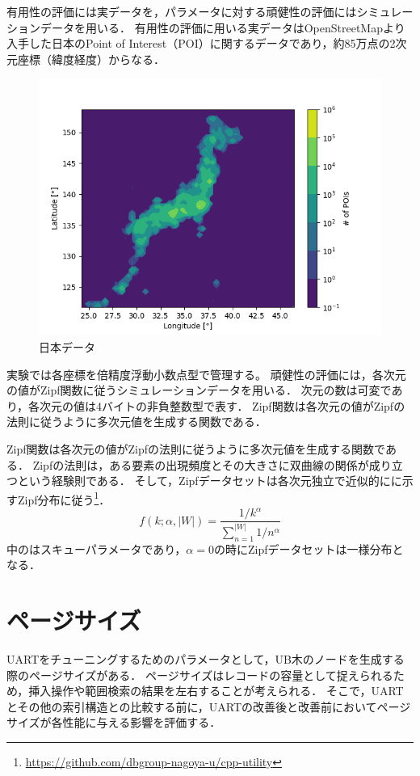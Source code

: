 有用性の評価には実データを，パラメータに対する頑健性の評価にはシミュレーションデータを用いる．
有用性の評価に用いる実データはOpenStreetMapより入手した日本のPoint of Interest（POI）に関するデータであり，約85万点の2次元座標（緯度経度）からなる．
\Fig{\ref{fig:japan}}
\begin{figure}[tb]
  \centering
  \includegraphics[scale=0.4]{./figures/japan-poi.png}
  \caption{日本データ}
  \label{fig:japan}
\end{figure}
実験では各座標を倍精度浮動小数点型で管理する。
頑健性の評価には，各次元の値がZipf関数に従うシミュレーションデータを用いる．
次元の数は可変であり，各次元の値は4バイトの非負整数型で表す．
Zipf関数は各次元の値がZipfの法則に従うように多次元値を生成する関数である．

Zipf関数は各次元の値がZipfの法則に従うように多次元値を生成する関数である．
Zipfの法則は，ある要素の出現頻度とその大きさに双曲線の関係が成り立つという経験則である．
そして，Zipfデータセットは各次元独立で近似的に\Eq{\ref{eq:zipf}}に示すZipf分布に従う\footnote{\footnotesize\url{https://github.com/dbgroup-nagoya-u/cpp-utility}}．
\begin{equation}
  \label{eq:zipf}
  f(k; \alpha, |W|) = \frac{1 / k^{\alpha}}{\sum_{n = 1}^{|W|} 1 / n^{\alpha}}
\end{equation}
\Eq{\ref{eq:zipf}}中の\alpha はスキューパラメータであり，$\alpha = 0$の時にZipfデータセットは一様分布となる．

\section{ページサイズ}
UARTをチューニングするためのパラメータとして，UB木のノードを生成する際のページサイズがある．
ページサイズはレコードの容量として捉えられるため，挿入操作や範囲検索の結果を左右することが考えられる．
そこで，UARTとその他の索引構造との比較する前に，UARTの改善後と改善前においてページサイズが各性能に与える影響を評価する．

